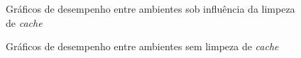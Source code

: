 \begin{figure}[htpb]
        \centering
        \caption{Gráficos de desempenho entre ambientes sob influência da limpeza de \textit{cache}}
        \label{fig:qph_model_cache}
\end{figure}

\begin{figure}[t]
        \centering
        \caption{Gráficos de desempenho entre ambientes sem limpeza de \textit{cache}}
        \label{fig:qph_model_cache_2}
\end{figure}

